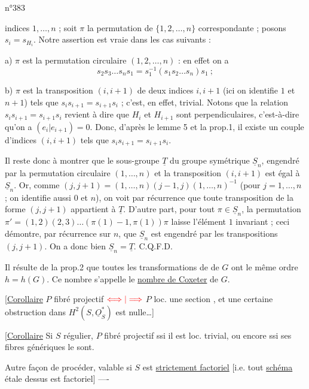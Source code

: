 \hfill n°383

indices $1,\ldots,n$ ; soit $\pi$ la permutation de $\{1,2,\ldots,n\}$ correspondante ; posons $s_i=s_{H_i}$. Notre assertion est vraie dans les cas suivants :

a) $\pi$ est la permutation circulaire $(1,2,\ldots,n)$ : en effet on a
\[
s_2s_3\ldots s_ns_1=s_1^{-1}(s_1s_2\ldots s_n)s_1\ ;
\]

b) $\pi$ est la transposition $(i,i+1)$ de deux indices $i,i+1$ (ici on identifie $1$ et $n+1$) tels que $s_is_{i+1}=s_{i+1}s_i$ ; c'est, en effet, trivial. Notons que la relation $s_is_{i+1}=s_{i+1}s_i$ revient à dire que $H_i$ et $H_{i+1}$ sont perpendiculaires, c'est-à-dire qu'on a $(e_i|e_{i+1})=0$. Donc, d'après le lemme 5 et la prop.1, il existe un couple d'indices $(i,i+1)$ tels que $s_is_{i+1}=s_{i+1}s_i$.

Il reste donc à montrer que le sous-groupe $\underline{T}$ du groupe symétrique $\underline{S}_n$, engendré par la permutation circulaire $(1,\ldots,n)$ et la transposition $(i,i+1)$ est égal à $\underline{S}_n$. Or, comme $(j,j+1)=(1,\ldots,n)(j-1,j)(1,\ldots,n)^{-1}$ (pour $j=1,\ldots,n$ ; on identifie aussi $0$ et $n$), on voit par récurrence que toute transposition de la forme $(j,j+1)$ appartient à $\underline{T}$. D'autre part, pour tout $\pi\in\underline{S}_n$, la permutation $\pi'=(1,2)(2,3)\ldots(\pi(1)-1,\pi(1))\pi$ laisse l'élément $1$ invariant ; ceci démontre, par récurrence sur $n$, que $\underline{S}_n$ est engendré par les transpositions $(j,j+1)$. On a donc bien $\underline{S}_n=\underline{T}$. C.Q.F.D.

Il résulte de la prop.2 que toutes les transformations de  de $G$ ont le même ordre $h=h(G)$. Ce nombre s'appelle le \uline{nombre de Coxeter} de $G$.


[\uline{Corollaire} $P$ fibré projectif ${\color{red}\Longleftrightarrow|\Longrightarrow}$ $P$  loc. une section , et une certaine obstruction dans $H^2(S,\underline{O}_S^*)$ est nulle\ldots]

[\uline{Corollaire} Si $S$ régulier, $P$ fibré projectif ssi il est loc. trivial, ou encore ssi ses fibres génériques le sont.

Autre façon de procéder, valable si $S$ est \uline{strictement  factoriel} [i.e. tout \uline{schéma} étale dessus est  factoriel] ----

